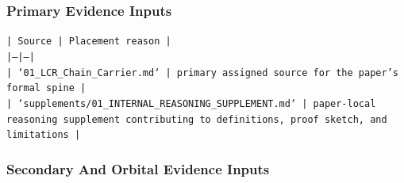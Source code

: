 \documentclass[11pt]{article}
\begin{document}
\subsubsection*{Primary Evidence Inputs}

\noindent\texttt{| Source | Placement reason |}\\
\noindent\texttt{|---|---|}\\
\noindent\texttt{| `01\_LCR\_Chain\_Carrier.md` | primary assigned source for the paper's formal spine |}\\
\noindent\texttt{| `supplements/01\_INTERNAL\_REASONING\_SUPPLEMENT.md` | paper-local reasoning supplement contributing to definitions, proof sketch, and limitations |}\\

\subsubsection*{Secondary And Orbital Evidence Inputs}
\end{document}
